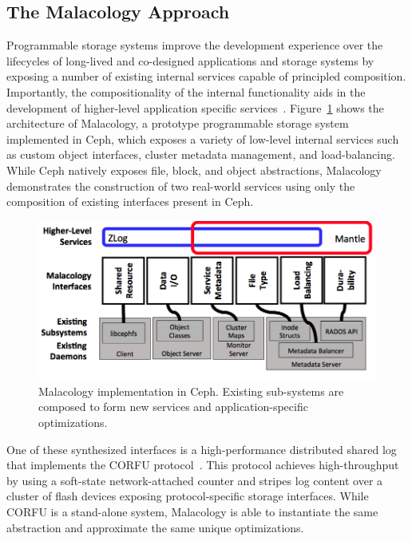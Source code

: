 \subsection{The Malacology Approach}


Programmable storage systems improve the development experience over the lifecycles of long-lived and co-designed applications
and storage systems by exposing a number of existing internal services capable of principled composition. Importantly, the compositionality of the internal functionality aids in the development of higher-level application specific services~\cite{sevilla:eurosys17}.
Figure~\ref{fig:malacology} shows the architecture of Malacology, a prototype programmable storage system
implemented in Ceph, which exposes a variety of low-level internal services
such as custom object interfaces, cluster metadata management, and
load-balancing. While Ceph natively exposes file, block, and object
abstractions, Malacology demonstrates the construction of two real-world
services using only the composition of existing interfaces present in Ceph.

\begin{figure}[t]
\centering
\includegraphics[width=1.0\linewidth]{implementation-overview.png}
\caption{Malacology implementation in Ceph. Existing sub-systems are composed
    to form new services and application-specific optimizations.}
\label{fig:malacology}
\end{figure}

One of these synthesized interfaces is a high-performance distributed shared
log that implements the CORFU protocol~\cite{balakrishnan:nsdi12}.
This protocol achieves high-throughput by using a soft-state network-attached
counter and stripes log content over a cluster of flash devices exposing
protocol-specific storage interfaces. While CORFU is a stand-alone system,
Malacology is able to instantiate the same abstraction and approximate 
the same unique optimizations.

